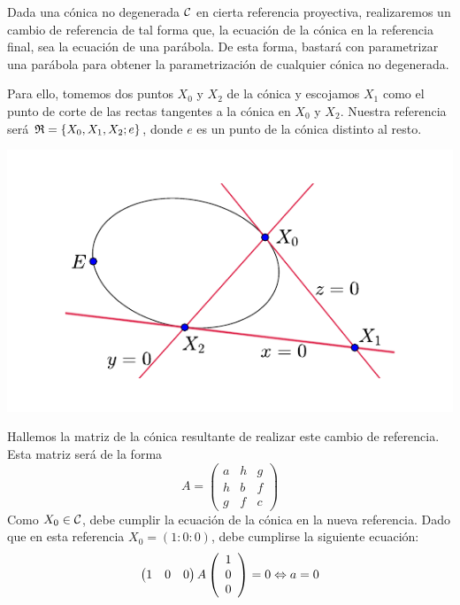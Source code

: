 Dada una cónica no degenerada $\mathcal{C}$ en cierta referencia proyectiva, realizaremos un cambio de referencia de tal forma que, la ecuación de la cónica en la referencia final, sea la ecuación de una parábola. De esta forma, bastará con parametrizar una parábola para obtener la parametrización de cualquier cónica no degenerada.

Para ello, tomemos dos puntos $X_0$ y $X_2$ de la cónica y escojamos $X_1$ como el punto de corte de las rectas tangentes a la cónica en $X_0$ y $X_2$. Nuestra referencia será $\mathfrak{R}=\{X_0,X_1,X_2;e\}$, donde $e$ es un punto de la cónica distinto al resto.
\begin{center}
	\includegraphics[scale=.9]{Graficos/Conicas/Parametrizacionparabola}
\end{center}
Hallemos la matriz de la cónica resultante de realizar este cambio de referencia. Esta matriz será de la forma
\begin{equation*}
	A=\left( \begin{array}{ccc}
	a & h & g\\
	h & b & f\\
	g & f & c
	\end{array}\right) 
\end{equation*}
Como $X_0\in \mathcal{C}$, debe cumplir la ecuación de la cónica en la nueva referencia. Dado que en esta referencia $X_0=(1:0:0)$, debe cumplirse la siguiente ecuación:
\begin{equation*}
	\begin{pmatrix}
		1 & 0 & 0
	\end{pmatrix}A 
	\left( \begin{array}{c}
		1\\0\\0
	\end{array}\right) =0\Leftrightarrow a=0
\end{equation*}
